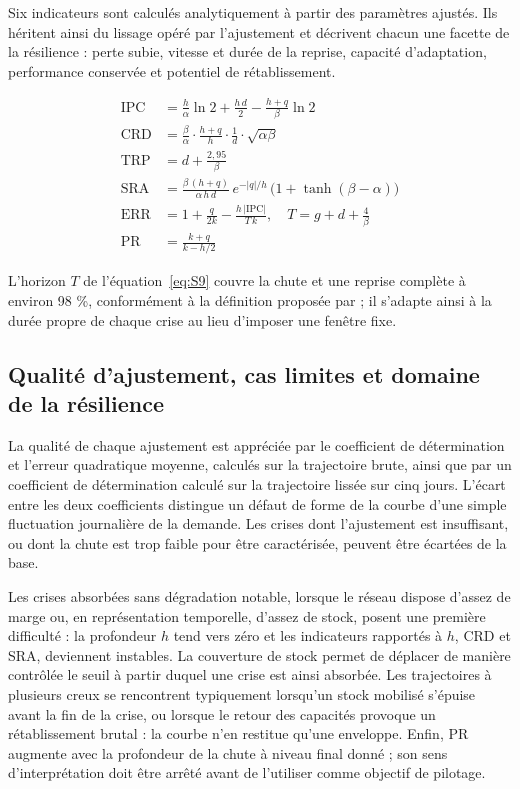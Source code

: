 Six indicateurs sont calculés analytiquement à partir des paramètres ajustés. Ils héritent ainsi du lissage opéré par l'ajustement et décrivent chacun une facette de la résilience : perte subie, vitesse et durée de la reprise, capacité d'adaptation, performance conservée et potentiel de rétablissement.

\begin{align}
\mathrm{IPC} &= \frac{h}{\alpha}\ln 2 + \frac{h\,d}{2} - \frac{h + q}{\beta}\ln 2 \label{eq:S5} \\
\mathrm{CRD} &= \frac{\beta}{\alpha}\cdot\frac{h + q}{h}\cdot\frac{1}{d}\cdot\sqrt{\alpha\beta} \label{eq:S6} \\
\mathrm{TRP} &= d + \frac{2{,}95}{\beta} \label{eq:S7} \\
\mathrm{SRA} &= \frac{\beta\,(h + q)}{\alpha\,h\,d}\, e^{-|q|/h}\,\big(1 + \tanh(\beta - \alpha)\big) \label{eq:S8} \\
\mathrm{ERR} &= 1 + \frac{q}{2k} - \frac{h\,|\mathrm{IPC}|}{T\,k}, \quad T = g + d + \frac{4}{\beta} \label{eq:S9} \\
\mathrm{PR} &= \frac{k + q}{k - h/2} \label{eq:S10}
\end{align}

L'horizon $T$ de l'équation~\eqref{eq:S9} couvre la chute et une reprise complète à environ 98 \%, conformément à la définition proposée par \citet{rahiel2026in4pl} ; il s'adapte ainsi à la durée propre de chaque crise au lieu d'imposer une fenêtre fixe.

\subsection{Qualité d'ajustement, cas limites et domaine de la résilience}
\label{sec:S4.3}

La qualité de chaque ajustement est appréciée par le coefficient de détermination et l'erreur quadratique moyenne, calculés sur la trajectoire brute, ainsi que par un coefficient de détermination calculé sur la trajectoire lissée sur cinq jours. L'écart entre les deux coefficients distingue un défaut de forme de la courbe d'une simple fluctuation journalière de la demande. Les crises dont l'ajustement est insuffisant, ou dont la chute est trop faible pour être caractérisée, peuvent être écartées de la base.

Les crises absorbées sans dégradation notable, lorsque le réseau dispose d'assez de marge ou, en représentation temporelle, d'assez de stock, posent une première difficulté : la profondeur $h$ tend vers zéro et les indicateurs rapportés à $h$, CRD et SRA, deviennent instables. La couverture de stock permet de déplacer de manière contrôlée le seuil à partir duquel une crise est ainsi absorbée. Les trajectoires à plusieurs creux se rencontrent typiquement lorsqu'un stock mobilisé s'épuise avant la fin de la crise, ou lorsque le retour des capacités provoque un rétablissement brutal : la courbe n'en restitue qu'une enveloppe. Enfin, PR augmente avec la profondeur de la chute à niveau final donné ; son sens d'interprétation doit être arrêté avant de l'utiliser comme objectif de pilotage.

